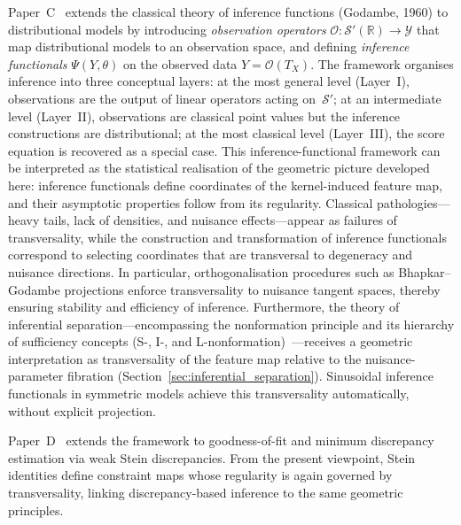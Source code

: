\documentclass[11pt,a4paper]{article}
\newcommand{\R}{\mathbb{R}}
\newcommand{\cS}{\mathcal{S}}
\begin{document}
\medskip

Paper~C~\cite{C} extends the classical theory of inference functions
(Godambe, 1960) to distributional models by introducing \emph{observation
operators} $\mathcal{O} : \cS'(\R) \to \mathcal{Y}$ that map distributional
models to an observation space, and defining \emph{inference functionals}
$\Psi(Y, \theta)$ on the observed data $Y = \mathcal{O}(T_X)$.  The
framework organises inference into three conceptual layers: at the most
general level (Layer~I), observations are the output of linear operators
acting on~$\cS'$; at an intermediate level (Layer~II), observations are
classical point values but the inference constructions are distributional; at
the most classical level (Layer~III), the score equation is recovered as a
special case.
This inference-functional framework can be interpreted as the statistical
realisation of the geometric picture developed here: inference functionals
define coordinates of the kernel-induced feature map, and their asymptotic
properties follow from its regularity.  Classical pathologies---heavy tails,
lack of densities, and nuisance effects---appear as failures of
transversality, while the construction and transformation of inference
functionals correspond to selecting coordinates that are transversal to
degeneracy and nuisance directions.  In particular, orthogonalisation
procedures such as Bhapkar--Godambe projections enforce transversality to
nuisance tangent spaces, thereby ensuring stability and efficiency of
inference.  Furthermore, the theory of inferential
separation---encompassing the nonformation principle and its hierarchy of
sufficiency concepts (S-, I-, and
L-nonformation)~\cite{JorgensenLabouriau2012}---receives a geometric
interpretation as transversality of the feature map relative to the
nuisance-parameter fibration (Section~\ref{sec:inferential_separation}).
Sinusoidal inference functionals in symmetric models achieve this
transversality automatically, without explicit projection.

\medskip

Paper~D~\cite{D} extends the framework to goodness-of-fit and minimum
discrepancy estimation via weak Stein discrepancies. From the present
viewpoint, Stein identities define constraint maps whose regularity is again
governed by transversality, linking discrepancy-based inference to the same
geometric principles.

\medskip
\end{document}
